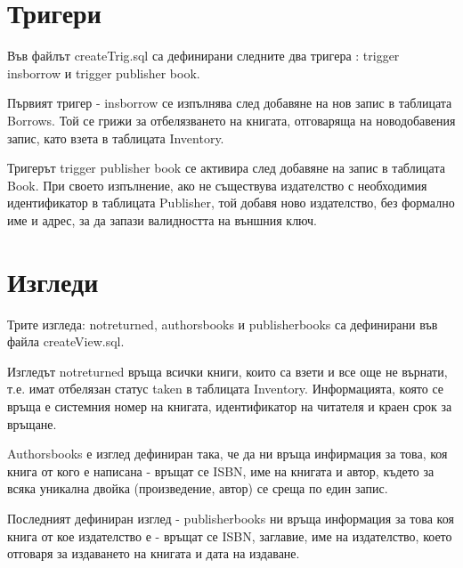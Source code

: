 \documentclass[11pt,a4paper]{article}
\begin{document}
\section {Тригери}
Във файлът createTrig.sql са дефинирани следните два тригера : trigger \textunderscore ins\textunderscore borrow и trigger \textunderscore publisher \textunderscore book. 
\par
Първият тригер - \textunderscore ins\textunderscore borrow се изпълнява след добавяне на нов запис в таблицата Borrows. Той се грижи за отбелязването на книгата, отговаряща на новодобавения запис, като взета в таблицата Inventory.
\par
Тригерът trigger \textunderscore publisher \textunderscore book се активира след добавяне на запис в таблицата Book. При своето изпълнение, ако не съществува издателство с необходимия идентификатор в таблицата Publisher, той добавя ново издателство, без формално име и адрес, за да запази валидността на външния ключ.
\section {Изгледи}
Трите изгледа: not\textunderscore returned, authorsbooks и publisher\textunderscore books са дефинирани във файла createView.sql.
\par
Изгледът not\textunderscore returned връща всички книги, които са взети и все още не върнати, т.е. имат отбелязан статус taken в таблицата Inventory. Информацията, която се връща е системния номер на книгата, идентификатор на читателя и краен срок за връщане.
\par
Authorsbooks е изглед дефиниран така, че да ни връща инфирмация за това, коя книга от кого е написана - връщат се ISBN, име на книгата и автор, където за всяка уникална двойка (произведение, автор) се среща по един запис.
\par
Последният дефиниран изглед - publisher\textunderscore books ни връща информация за това коя книга от кое издателство е - връщат се ISBN, заглавие, име на издателство, което отговаря за издаването на книгата и дата на издаване.
\end{document}
